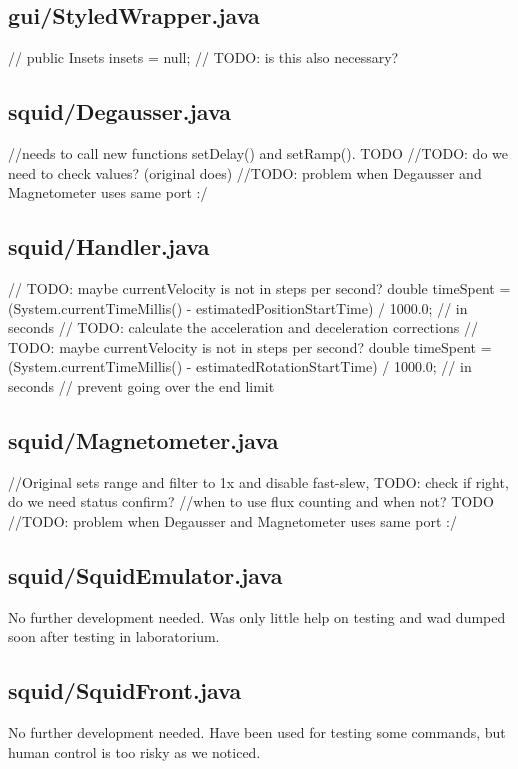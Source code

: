 \subsection{gui/StyledWrapper.java}
//        public Insets insets = null; // TODO: is this also necessary?

\subsection{squid/Degausser.java}
        //needs to call new functions setDelay() and setRamp(). TODO
        //TODO: do we need to check values? (original does)
        //TODO: problem when Degausser and Magnetometer uses same port :/

\subsection{squid/Handler.java}
        // TODO: maybe currentVelocity is not in steps per second?
        double timeSpent = (System.currentTimeMillis() - estimatedPositionStartTime) / 1000.0;    // in seconds
        // TODO: calculate the acceleration and deceleration corrections
        // TODO: maybe currentVelocity is not in steps per second?
        double timeSpent = (System.currentTimeMillis() - estimatedRotationStartTime) / 1000.0;    // in seconds
        // prevent going over the end limit

\subsection{squid/Magnetometer.java}
            //Original sets range and filter to 1x and disable fast-slew, TODO: check if right, do we need status confirm?
        //when to use flux counting and when not? TODO
        //TODO: problem when Degausser and Magnetometer uses same port :/

\subsection{squid/SquidEmulator.java}
            No further development needed. Was only little help on testing and wad dumped soon after testing in laboratorium.

\subsection{squid/SquidFront.java}
	No further development needed. Have been used for testing some commands, but human control is too risky as we noticed.

